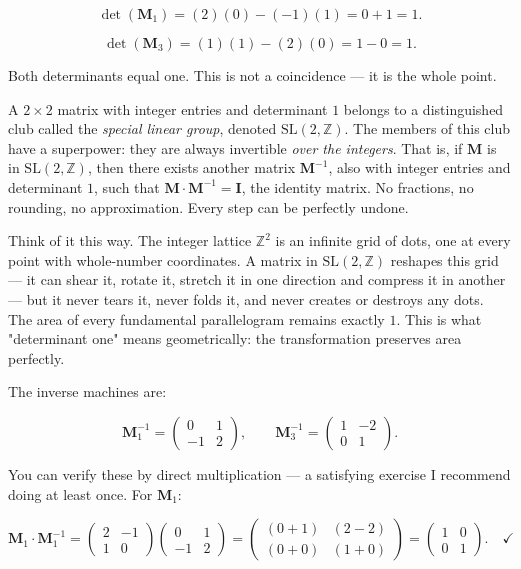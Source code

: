\documentclass[11pt,openany]{book}
\theoremstyle{definition}
\theoremstyle{plain}
\theoremstyle{remark}
\begin{document}
\[
\det(\mathbf{M}_1) = (2)(0) - (-1)(1) = 0 + 1 = 1.
\]


\[
\det(\mathbf{M}_3) = (1)(1) - (2)(0) = 1 - 0 = 1.
\]


Both determinants equal one. This is not a coincidence — it is the whole point.

A $2 \times 2$ matrix with integer entries and determinant $1$ belongs to a distinguished club called the \textit{special linear group}, denoted $\mathrm{SL}(2, \mathbb{Z})$. The members of this club have a superpower: they are always invertible \textit{over the integers}. That is, if $\mathbf{M}$ is in $\mathrm{SL}(2, \mathbb{Z})$, then there exists another matrix $\mathbf{M}^{-1}$, also with integer entries and determinant $1$, such that $\mathbf{M} \cdot \mathbf{M}^{-1} = \mathbf{I}$, the identity matrix. No fractions, no rounding, no approximation. Every step can be perfectly undone.

Think of it this way. The integer lattice $\mathbb{Z}^2$ is an infinite grid of dots, one at every point with whole-number coordinates. A matrix in $\mathrm{SL}(2, \mathbb{Z})$ reshapes this grid — it can shear it, rotate it, stretch it in one direction and compress it in another — but it never tears it, never folds it, and never creates or destroys any dots. The area of every fundamental parallelogram remains exactly $1$. This is what "determinant one" means geometrically: the transformation preserves area perfectly.

The inverse machines are:

\[
\mathbf{M}_1^{-1} = \begin{pmatrix} 0 & 1 \\ -1 & 2 \end{pmatrix}, \qquad
\mathbf{M}_3^{-1} = \begin{pmatrix} 1 & -2 \\ 0 & 1 \end{pmatrix}.
\]


You can verify these by direct multiplication — a satisfying exercise I recommend doing at least once. For $\mathbf{M}_1$:

\[
\mathbf{M}_1 \cdot \mathbf{M}_1^{-1} = \begin{pmatrix} 2 & -1 \\ 1 & 0 \end{pmatrix} \begin{pmatrix} 0 & 1 \\ -1 & 2 \end{pmatrix} = \begin{pmatrix} (0+1) & (2-2) \\ (0+0) & (1+0) \end{pmatrix} = \begin{pmatrix} 1 & 0 \\ 0 & 1 \end{pmatrix}. \quad \checkmark
\]
\end{document}
